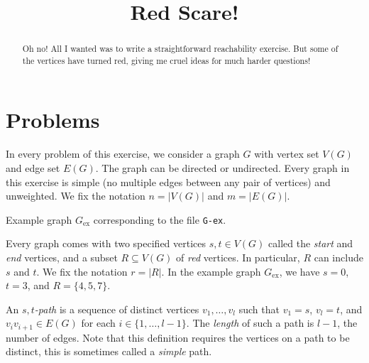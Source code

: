 \documentclass{tufte-handout}
\title{Red Scare!}
\begin{document}
\maketitle
\begin{abstract}
Oh no! All I wanted was to write a straightforward reachability exercise.
But some of the vertices have turned red, giving me cruel ideas for much harder questions! 
\end{abstract}
\section{Problems}
In every problem of this exercise, we consider a graph $G$ with vertex set $V(G)$ and edge set $E(G)$.
The graph can be directed or undirected.
Every graph in this exercise is simple (no multiple edges between any pair of vertices) and unweighted.
We fix the notation $n=|V(G)|$ and $m=|E(G)|$.

\begin{marginfigure}
 \caption{Example graph $G_{\text{ex}}$ corresponding to the file {\tt G-ex}.}
\end{marginfigure}

Every graph comes with two specified vertices $s,t\in V(G)$ called the \emph{start} and \emph{end} vertices, and a subset $R\subseteq V(G)$ of \emph{red} vertices.
In particular, $R$ can include $s$ and $t$.
We fix the notation $r= |R|$.
In the example graph $G_{\text{ex}}$, we have $s=0$, $t=3$, and $R=\{4,5,7\}$.

An \emph{$s,t$-path} is a sequence of distinct vertices $v_1,\ldots, v_l$ such that $v_1=s$, $v_l=t$, and $v_iv_{i+1}\in E(G)$ for each $i\in\{1,\ldots,l-1\}$.
The \emph{length} of such a path is $l-1$, the number of edges.
Note that this definition requires the vertices on a path to be distinct, this is sometimes called a \emph{simple} path.
\end{document}
